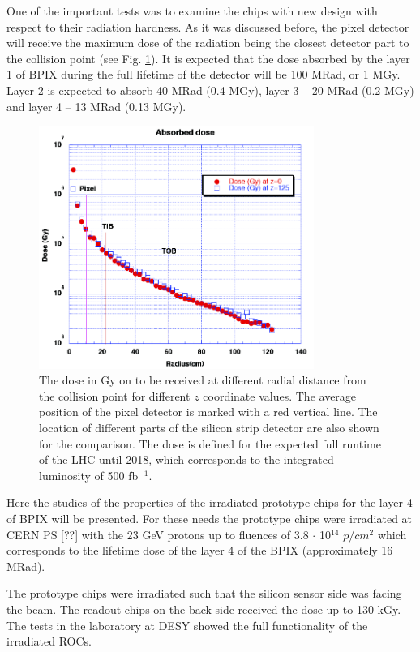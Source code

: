 One of the important tests was to examine the chips with new design with respect to their radiation hardness. As it was discussed before, the
pixel detector will receive the maximum dose of the radiation being the closest detector part to the collision point (see Fig. \ref{fig:irrad_dose}).
It is expected that the dose absorbed by the layer 1 of BPIX during the full lifetime of the detector will be 100 MRad, or 1 MGy. Layer 2 is 
expected to absorb 40 MRad (0.4 MGy), layer 3 -- 20 MRad (0.2 MGy) and layer 4 -- 13 MRad (0.13 MGy).

\begin{figure}[t]
 \centering
 \includegraphics[width=0.8\textwidth]{021_pixel_upgrade/plots/irradiation_dose.png}
 \caption{The dose in Gy on to be received at different radial distance from the collision point for different $z$ coordinate values. The 
 average position of the pixel detector is marked with a red vertical line. The location of different parts of the silicon strip detector
 are also shown for the comparison. The dose is defined for the expected full runtime of the LHC until 2018, which corresponds to the integrated
 luminosity of 500 fb$^{-1}$.}
 \label{fig:irrad_dose}
\end{figure}

Here the studies of the properties of the irradiated prototype chips for the layer 4 of BPIX will be presented. For these needs the prototype
chips were irradiated at CERN PS [??] with the 23 GeV protons up to fluences of 3.8 $\cdot$ 10$^{14}$ $p/cm^{2}$ which corresponds to the lifetime
dose of the layer 4 of the BPIX (approximately 16 MRad). 

The prototype chips were irradiated such that the silicon sensor side was facing the beam. The readout chips on the back side received the dose
up to 130 kGy. The tests  in the laboratory at DESY \cite{DESYWeb} showed the full functionality of the irradiated ROCs.

